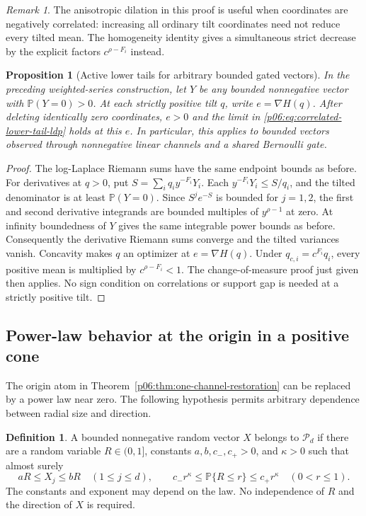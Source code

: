 \documentclass[11pt,letterpaper]{article}
\newtheorem{proposition}[theorem]{Proposition}
\theoremstyle{definition}
\newtheorem{definition}[theorem]{Definition}
\theoremstyle{remark}
\newtheorem{remark}[theorem]{Remark}
\newcommand{\1}{\mathbf 1}
\begin{document}
\begin{remark}
The anisotropic dilation in this proof is useful when coordinates are
negatively correlated: increasing all ordinary tilt coordinates need not
reduce every tilted mean. The homogeneity identity gives a simultaneous
strict decrease by the explicit factors $c^{\rho-F_i}$ instead.
\end{remark}

\begin{proposition}[Active lower tails for arbitrary bounded gated vectors]
\label{p06:prop:gated-active-ldp}
In the preceding weighted-series construction, let $Y$ be any bounded
nonnegative vector with $\mathbb P(Y=0)>0$. At each strictly positive
tilt $q$, write $e=\nabla H(q)$. After deleting identically zero
coordinates, $e>0$ and the limit in
\eqref{p06:eq:correlated-lower-tail-ldp} holds at this $e$.
In particular, this applies to bounded vectors observed through
nonnegative linear channels and a shared Bernoulli gate.
\end{proposition}
\begin{proof}
The log-Laplace Riemann sums have the same endpoint bounds as before.
For derivatives at $q>0$, put
$S=\sum_i q_i y^{-F_i}Y_i$. Each
$y^{-F_i}Y_i\le S/q_i$, and the tilted denominator is at least
$\mathbb P(Y=0)$. Since $S^j e^{-S}$ is bounded for $j=1,2$,
the first and second derivative integrands are bounded multiples of
$y^{\rho-1}$ at zero. At infinity boundedness of $Y$ gives the same
integrable power bounds as before. Consequently the derivative
Riemann sums converge and the tilted variances vanish. Concavity makes
$q$ an optimizer at $e=\nabla H(q)$. Under
$q_{c,i}=c^{F_i}q_i$, every positive mean is multiplied by
$c^{\rho-F_i}<1$. The change-of-measure proof just given then applies.
No sign condition on correlations or support gap is needed at a
strictly positive tilt.
\end{proof}


\subsection{Power-law behavior at the origin in a positive cone}
\label{p06:sec:continuous-correlated-extension}

The origin atom in Theorem~\ref{p06:thm:one-channel-restoration} can be
replaced by a power law near zero. The following hypothesis permits
arbitrary dependence between radial size and direction.

\begin{definition}
A bounded nonnegative random vector $X$ belongs to $\mathcal P_d$ if
there are a random variable $R\in(0,1]$, constants $a,b,c_-,c_+>0$,
and $\kappa>0$ such that almost surely
\[
 aR\le X_j\le bR\quad(1\le j\le d),\qquad
 c_-r^\kappa\le\mathbb P\{R\le r\}\le c_+r^\kappa
 \quad(0<r\le1).
\]
The constants and exponent may depend on the law. No independence of
$R$ and the direction of $X$ is required.
\end{definition}
\end{document}
